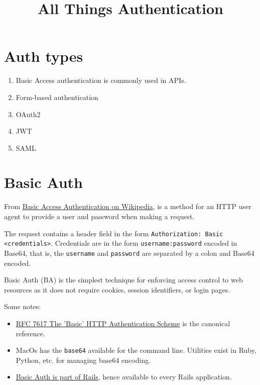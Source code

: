 \documentclass{article}
\title{All Things Authentication}
\begin{document}
\maketitle

\section{Auth types}


\begin{enumerate}
  \item Basic Access authentication is commonly used in APIs.
  \item Form-based authentication
  \item OAuth2
  \item JWT
  \item SAML
\end{enumerate}

\section{Basic Auth}

From \href{https://en.wikipedia.org/wiki/Basic_access_authentication}{%
  Basic Access Authentication on Wikipedia}, is a method for an HTTP
user agent to provide a user and password when making a request.

The request contains a header field in the form \texttt{Authorization: Basic
 <credentials>}. Credentials are in the form \texttt{username:password} encoded in
Base64, that is, the \texttt{username} and \texttt{password} are separated by a colon
and Base64 encoded.

Basic Auth (BA) is the simplest technique for enforcing access control to
web resources as it does not require cookies, session identifiers, or
login pages.

Some notes:
\begin{itemize}
  \item \href{https://tools.ietf.org/html/rfc7617}{%
      RFC 7617 The 'Basic' HTTP Authentication Scheme} is the
    canonical reference.
  \item MacOs has the \texttt{base64} available for the command line. Utilities
    exist in Ruby, Python, etc. for managing base64 encoding.
  \item \href{https://api.rubyonrails.org/classes/ActionController/HttpAuthentication/Basic.html}{%
      Basic Auth is part of Rails}, hence available to every Rails application.
\end{itemize}
\end{document}
